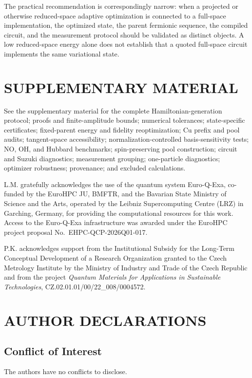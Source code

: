 \documentclass[
 aip,
 jcp,
 amsmath,amssymb,
 preprint
]{revtex4-2}
\begin{document}
The practical recommendation is correspondingly narrow:
when a projected or otherwise reduced-space adaptive optimization is connected to a full-space implementation, the optimized state, the parent fermionic sequence, the compiled circuit, and the measurement protocol should be validated as distinct objects.
A low reduced-space energy alone does not establish that a quoted full-space circuit implements the same variational state.

\section*{SUPPLEMENTARY MATERIAL}
See the supplementary material for the complete Hamiltonian-generation protocol; proofs and finite-amplitude bounds; numerical tolerances; state-specific certificates; fixed-parent energy and fidelity reoptimization; Cu prefix and pool audits; tangent-space accessibility; normalization-controlled basis-sensitivity tests; NO, OH, and Hubbard benchmarks; spin-preserving pool construction; circuit and Suzuki diagnostics; measurement grouping; one-particle diagnostics; optimizer robustness; provenance; and excluded calculations.

\begin{acknowledgments}
L.M. gratefully acknowledges the use of the quantum system Euro-Q-Exa, co-funded by the EuroHPC JU, BMFTR, and the Bavarian State Ministry of Science and the Arts, operated by the Leibniz Supercomputing Centre (LRZ) in Garching, Germany, for providing the computational resources for this work. Access to the Euro-Q-Exa infrastructure was awarded under the EuroHPC project proposal No.~EHPC-QCP-2026Q01-017.

P.K. acknowledges support from the Institutional Subsidy for the Long-Term Conceptual Development of a Research Organization granted to the Czech Metrology Institute by the Ministry of Industry and Trade of the Czech Republic and from the project \emph{Quantum Materials for Applications in Sustainable Technologies}, CZ.02.01.01/00/22\_008/0004572.
\end{acknowledgments}

\section*{AUTHOR DECLARATIONS}

\subsection*{Conflict of Interest}
The authors have no conflicts to disclose.
\end{document}
